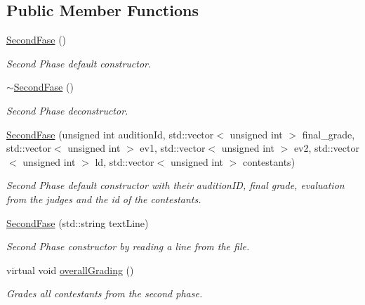 \subsection*{Public Member Functions}
\begin{DoxyCompactItemize}
\item 
\mbox{\label{class_second_fase_a04f651b3829af5a97ddc81df2db17384}} 
\hyperlink{class_second_fase_a04f651b3829af5a97ddc81df2db17384}{Second\+Fase} ()
\begin{DoxyCompactList}\small\item\em Second Phase default constructor. \end{DoxyCompactList}\item 
\mbox{\label{class_second_fase_acf9c72ecb82b2082a92fd90ab35a8f54}} 
\hyperlink{class_second_fase_acf9c72ecb82b2082a92fd90ab35a8f54}{$\sim$\+Second\+Fase} ()
\begin{DoxyCompactList}\small\item\em Second Phase deconstructor. \end{DoxyCompactList}\item 
\hyperlink{class_second_fase_a8e6899e5d9ed2b49e869e0c455192b7b}{Second\+Fase} (unsigned int audition\+Id, std\+::vector$<$ unsigned int $>$ final\+\_\+grade, std\+::vector$<$ unsigned int $>$ ev1, std\+::vector$<$ unsigned int $>$ ev2, std\+::vector$<$ unsigned int $>$ ld, std\+::vector$<$ unsigned int $>$ contestants)
\begin{DoxyCompactList}\small\item\em Second Phase default constructor with their audition\+ID, final grade, evaluation from the judges and the id of the contestants. \end{DoxyCompactList}\item 
\hyperlink{class_second_fase_a63902abd39ae02dd44c5fc100d343e3c}{Second\+Fase} (std\+::string text\+Line)
\begin{DoxyCompactList}\small\item\em Second Phase constructor by reading a line from the file. \end{DoxyCompactList}\item 
\mbox{\label{class_second_fase_a135168e57119481491c54dff5433397b}} 
virtual void \hyperlink{class_second_fase_a135168e57119481491c54dff5433397b}{overall\+Grading} ()
\begin{DoxyCompactList}\small\item\em Grades all contestants from the second phase. \end{DoxyCompactList}\end{DoxyCompactItemize}
